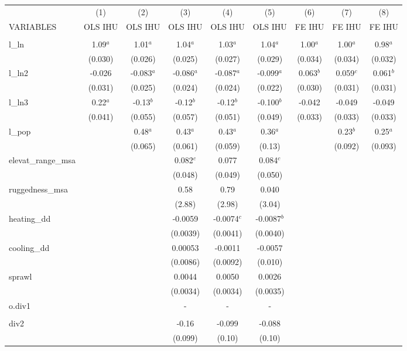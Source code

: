 \documentclass[]{article}
\begin{document}
\begin{tabular}{lcccccccc} \hline
 & (1) & (2) & (3) & (4) & (5) & (6) & (7) & (8) \\
VARIABLES & OLS IHU & OLS IHU & OLS IHU & OLS IHU & OLS IHU & FE IHU & FE IHU & FE IHU \\ \hline
 &  &  &  &  &  &  &  &  \\
l\_ln & 1.09$^a$ & 1.01$^a$ & 1.04$^a$ & 1.03$^a$ & 1.04$^a$ & 1.00$^a$ & 1.00$^a$ & 0.98$^a$ \\
 & (0.030) & (0.026) & (0.025) & (0.027) & (0.029) & (0.034) & (0.034) & (0.032) \\
l\_ln2 & -0.026 & -0.083$^a$ & -0.086$^a$ & -0.087$^a$ & -0.099$^a$ & 0.063$^b$ & 0.059$^c$ & 0.061$^b$ \\
 & (0.031) & (0.025) & (0.024) & (0.024) & (0.022) & (0.030) & (0.031) & (0.031) \\
l\_ln3 & 0.22$^a$ & -0.13$^b$ & -0.12$^b$ & -0.12$^b$ & -0.100$^b$ & -0.042 & -0.049 & -0.049 \\
 & (0.041) & (0.055) & (0.057) & (0.051) & (0.049) & (0.033) & (0.033) & (0.033) \\
l\_pop &  & 0.48$^a$ & 0.43$^a$ & 0.43$^a$ & 0.36$^a$ &  & 0.23$^b$ & 0.25$^a$ \\
 &  & (0.065) & (0.061) & (0.059) & (0.13) &  & (0.092) & (0.093) \\
elevat\_range\_msa &  &  & 0.082$^c$ & 0.077 & 0.084$^c$ &  &  &  \\
 &  &  & (0.048) & (0.049) & (0.050) &  &  &  \\
ruggedness\_msa &  &  & 0.58 & 0.79 & 0.040 &  &  &  \\
 &  &  & (2.88) & (2.98) & (3.04) &  &  &  \\
heating\_dd &  &  & -0.0059 & -0.0074$^c$ & -0.0087$^b$ &  &  &  \\
 &  &  & (0.0039) & (0.0041) & (0.0040) &  &  &  \\
cooling\_dd &  &  & 0.00053 & -0.0011 & -0.0057 &  &  &  \\
 &  &  & (0.0086) & (0.0092) & (0.010) &  &  &  \\
sprawl &  &  & 0.0044 & 0.0050 & 0.0026 &  &  &  \\
 &  &  & (0.0034) & (0.0034) & (0.0035) &  &  &  \\
o.div1 &  &  & - & - & - &  &  &  \\
 &  &  &  &  &  &  &  &  \\
div2 &  &  & -0.16 & -0.099 & -0.088 &  &  &  \\
 &  &  & (0.099) & (0.10) & (0.10) &  &  &  \\

\end{tabular}
\end{document}
